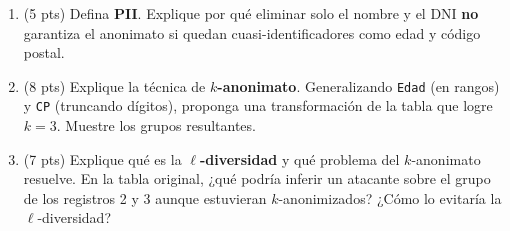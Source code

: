 \documentclass[11pt,a4paper]{article}
\begin{document}
\begin{enumerate}
  \item (5 pts) Defina \textbf{PII}. Explique por qué eliminar solo el nombre y el DNI \textbf{no} garantiza el anonimato si quedan cuasi-identificadores como edad y código postal.

  \vspace{3.5cm}

  \item (8 pts) Explique la técnica de \textbf{$k$-anonimato}. Generalizando \texttt{Edad} (en rangos) y \texttt{CP} (truncando dígitos), proponga una transformación de la tabla que logre \textbf{$k=3$}. Muestre los grupos resultantes.

  \vspace{5cm}

  \item (7 pts) Explique qué es la \textbf{$\ell$-diversidad} y qué problema del $k$-anonimato resuelve. En la tabla original, ¿qué podría inferir un atacante sobre el grupo de los registros 2 y 3 aunque estuvieran $k$-anonimizados? ¿Cómo lo evitaría la $\ell$-diversidad?

  \vspace{4.5cm}
\end{enumerate}
\end{document}
